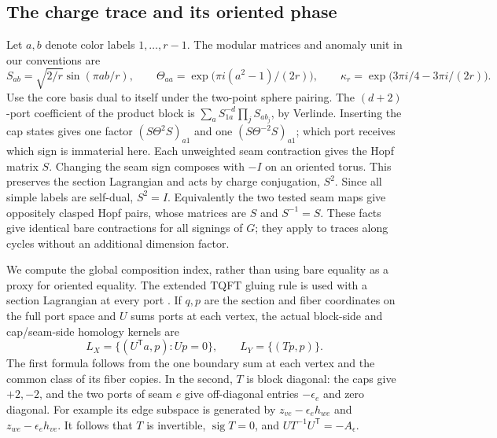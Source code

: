 \documentclass[11pt]{article}
\theoremstyle{remark}
\DeclareMathOperator{\sig}{sig}
\begin{document}
\subsection{The charge trace and its oriented phase}
Let \(a,b\) denote color labels \(1,\ldots,r-1\). The modular matrices and anomaly unit in our conventions are
\[
  S_{ab}=\sqrt{2/r}\sin(\pi ab/r),\qquad
  \Theta_{aa}=\exp\!\bigl(\pi i(a^2-1)/(2r)\bigr),\qquad
  \kappa_r=\exp\!\bigl(3\pi i/4-3\pi i/(2r)\bigr).
\]
Use the core basis dual to itself under the two-point sphere pairing. The \((d+2)\)-port coefficient of the product block is
\(\sum_a S_{1a}^{-d}\prod_jS_{ab_j}\), by Verlinde. Inserting the cap states gives one factor \((S\Theta^{2}S)_{a1}\) and one \((S\Theta^{-2}S)_{a1}\); which port receives which sign is immaterial here. Each unweighted seam contraction gives the Hopf matrix \(S\). Changing the seam sign composes with \(-I\) on an oriented torus. This preserves the section Lagrangian and acts by charge conjugation, \(S^2\). Since all simple labels are self-dual, \(S^2=I\). Equivalently the two tested seam maps give oppositely clasped Hopf pairs, whose matrices are \(S\) and \(S^{-1}=S\). These facts give identical bare contractions for all signings of \(G\); they apply to traces along cycles without an additional dimension factor.

We compute the global composition index, rather than using bare equality as a proxy for oriented equality. The extended TQFT gluing rule is used with a section Lagrangian at every port \cite{BHMV,GM,Turaev}. If \(q,p\) are the section and fiber coordinates on the full port space and \(U\) sums ports at each vertex, the actual block-side and cap/seam-side homology kernels are
\[
 L_X=\{(U^{\mathsf T}a,p):Up=0\},\qquad L_Y=\{(Tp,p)\}.
\]
The first formula follows from the one boundary sum at each vertex and the common class of its fiber copies. In the second, \(T\) is block diagonal: the caps give \(+2,-2\), and the two ports of seam \(e\) give off-diagonal entries \(-\epsilon_e\) and zero diagonal. For example its edge subspace is generated by \(z_{ve}-\epsilon_e h_{we}\) and \(z_{we}-\epsilon_e h_{ve}\). It follows that \(T\) is invertible, \(\sig T=0\), and \(UT^{-1}U^{\mathsf T}=-A_\epsilon\).
\end{document}
